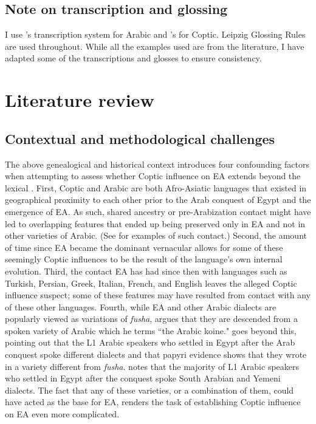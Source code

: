\documentclass[12pt,a4paper]{article}
\newcounter{example}
\begin{document}
\subsection{Note on transcription and glossing}

I use \textcite{lucas_introduction_2020}'s transcription system for Arabic and \textcite{abdelrahman_linguistic_2023}'s for Coptic. Leipzig Glossing Rules are used throughout. While all the examples used are from the literature, I have adapted some of the transcriptions and glosses to ensure consistency. 

\section{Literature review}

\subsection{Contextual and methodological challenges}
\label{subsec:challenges}

The above genealogical and historical context introduces four confounding factors when attempting to assess whether Coptic influence on EA extends beyond the lexical \parencite{bishai_notes_1960}. First, Coptic and Arabic are both Afro-Asiatic languages that existed in geographical proximity to each other prior to the Arab conquest of Egypt and the emergence of EA. As such, shared ancestry or pre-Arabization contact might have led to overlapping features that ended up being preserved only in EA and not in other varieties of Arabic. (See \textcite{abdelrahman_linguistic_2023, lucas_contact_2020} for examples of such contact.) Second, the amount of time since EA became the dominant vernacular allows for some of these seemingly Coptic influences to be the result of the language's own internal evolution. Third, the contact EA has had since then with languages such as Turkish, Persian, Greek, Italian, French, and English leaves the alleged Coptic influence suspect; some of these features may have resulted from contact with any of these other languages. Fourth, while EA and other Arabic dialects are popularly viewed as variations of \textit{fusha}, \textcite{ferguson_arabic_1959} argues that they are descended from a spoken variety of Arabic which he terms ``the Arabic koine." \textcite{rubenson_transition_1996} goes beyond this, pointing out that the L1 Arabic speakers who settled in Egypt after the Arab conquest spoke different dialects and that papyri evidence shows that they wrote in a variety different from \textit{fusha}. \textcite{abdelrahman_linguistic_2023} notes that the majority of L1 Arabic speakers who settled in Egypt after the conquest spoke South Arabian and Yemeni dialects. The fact that any of these varieties, or a combination of them, could have acted as the base for EA, renders the task of establishing Coptic influence on EA even more complicated. 
\end{document}
